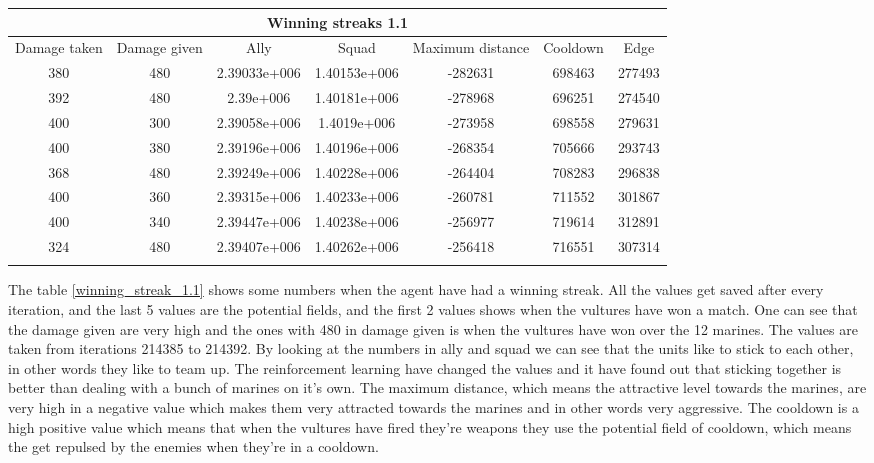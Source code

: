 
 \begin{tabular}{|c||c|c|c|c|c|c|}
	\multicolumn{7}{c}{Winning streaks 1.1} \\
	\hline
	Damage taken &			 Damage given &		 Ally &		 Squad &		 Maximum distance &		 Cooldown & 		Edge \\
	\hline
	380& 				 		480&						2.39033e+006&1.40153e+006&-282631&			698463&			277493\\
	392& 						480& 					2.39e+006&		1.40181e+006&-278968&			696251&			274540\\
	400& 						300& 					2.39058e+006&1.4019e+006&	-273958&			698558&			279631\\
	400& 						380& 					2.39196e+006&1.40196e+006&-268354&			705666&			293743\\
	368& 						480& 					2.39249e+006&1.40228e+006&-264404&			708283&			296838\\
	400& 						360& 					2.39315e+006&1.40233e+006&-260781&			711552&			301867\\
	400& 						340& 					2.39447e+006&1.40238e+006&-256977&			719614&			312891\\
	324& 						480&						2.39407e+006&1.40262e+006&-256418&			716551&			307314\\
	\hline
	\label{winning_streak_1.1}
\end{tabular}
The table \ref{winning_streak_1.1} shows some numbers when the agent have had a winning streak. All the values get saved after every iteration, and the last 5 values are the potential fields, and the first 2 values shows when the vultures have won a match. One can see that the damage given are very high and the ones with 480 in damage given is when the vultures have won over the 12 marines. The values are taken from iterations 214385 to 214392. By looking at the numbers in ally and squad we can see that the units like to stick to each other, in other words they like to team up. The reinforcement learning have changed the values and it have found out that sticking together is better than dealing with a bunch of marines on it's own. The maximum distance, which means the attractive level towards the marines, are very high in a negative value which makes them very attracted towards the marines and in other words very aggressive. The cooldown is a high positive value which means that when the vultures have fired they're weapons they use the potential field of cooldown, which means the get repulsed by the enemies when they're in a cooldown. 








